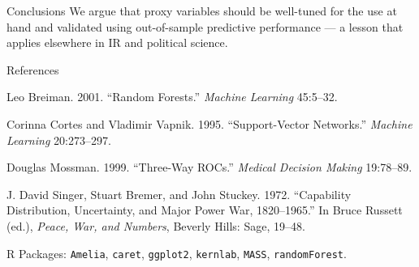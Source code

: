\documentclass[final]{beamer}
\begin{document}
\begin{frame}{}
\begin{columns}
\begin{column}{.32\textwidth}
{\begin{block}{Conclusions}
          \bigskip%
          We argue that proxy variables should be well-tuned for the use at
          hand and validated using out-of-sample predictive performance --- a
          lesson that applies elsewhere in IR and political science.
        \end{block}

        \vfill

        \begin{block}{References}
          \footnotesize

          Leo Breiman.  2001.  ``Random Forests.''  \textit{Machine Learning}
          45:5--32.

          \medskip%
          Corinna Cortes and Vladimir Vapnik.  1995.  ``Support-Vector
          Networks.''  \textit{Machine Learning} 20:273--297.

          \medskip%
          Douglas Mossman.  1999.  ``Three-Way ROCs.''  \textit{Medical
            Decision Making} 19:78--89.

          \medskip%
          J. David Singer, Stuart Bremer, and John Stuckey.  1972.
          ``Capability Distribution, Uncertainty, and Major Power War,
          1820--1965.''  In Bruce Russett (ed.), \textit{Peace, War, and
            Numbers}, Beverly Hills: Sage, 19--48.

          \medskip%
          R Packages: \texttt{Amelia}, \texttt{caret}, \texttt{ggplot2},
          \texttt{kernlab}, \texttt{MASS}, \texttt{randomForest}.
        \end{block}
      }
    \end{column}

  \end{columns}

\end{frame}
\end{document}

